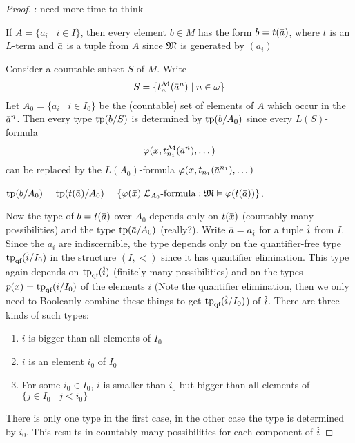\documentclass[11pt]{article}
\def \qf {\text{qf}}
\begin{document}
\begin{proof}
\label{BIG Problem}: need more time to think

If \(A=\{a_i\mid i\in I\}\), then every element \(b\in M\) has the form \(b=t(\bara)\), where \(t\) is
an \(L\)-term and \(\bara\) is a tuple from \(A\) since \(\mathfrak{M}\) is generated by \((a_i)\)

Consider a countable subset \(S\) of \(M\). Write
\begin{equation*}
S=\{t_n^{\calm}(\bara^n)\mid n\in\omega\}
\end{equation*}
Let \(A_0=\{a_i\mid i\in I_0\}\) be the (countable) set of elements of \(A\) which occur in
the \(\bara^n\). Then every type \(\operatorname{tp}(b/S)\) is determined by \(\operatorname{tp}(b/A_0)\) since
every \(L(S)\)-formula
\begin{equation*}
\varphi(x,t_{n_1}^{\calm}(\bara^{n}),\dots)
\end{equation*}
can be replaced by the \(L(A_0)\)-formula \(\varphi(x,t_{n_1}(\bara^{n_1}),\dots)\)

\(\tp(b/A_0)=\tp(t(\bara)/A_0)=\{\varphi(\barx)\; \call_{A_0}\text{-formula}: \fM\vDash\varphi(t(\bara))\}\).

Now the type of \(b=t(\bara)\) over \(A_0\) depends only on \(t(\barx)\) (countably many
possibilities) and the type \(\tp(\bara/A_0)\) (really?). Write \(\bara=a_{\bari}\) for a tuple \(\bari\)
from \(I\). \uline{Since the \(a_i\) are indiscernible, the type depends only on}
\uline{the quantifier-free type \(\tp_{\qf}(\bari/I_0)\) in the structure \((I,<)\)} since it has
quantifier elimination. This type again depends on \(\tp_{\qf}(\bari)\) (finitely many
possibilities) and on the types  \(p(x)=\tp_{\qf}(i/I_0)\) of the elements \(i\) (Note the
quantifier elimination, then we only need to Booleanly combine these things to get \(\tp_{\qf}(\bari/I_0)\))
of \(\bari\). There are three kinds of such types:
\begin{enumerate}
\item \(i\) is bigger than all elements of \(I_0\)
\item \(i\) is an element \(i_0\) of \(I_0\)
\item For some \(i_0\in I_0\), \(i\) is smaller than \(i_0\) but bigger than all elements
of \(\{j\in I_0\mid j<i_0\}\)
\end{enumerate}


There is only one type in the first case, in the other case the type is determined by \(i_0\).
This results in countably many possibilities for each component of \(\bari\)
\end{proof}
\end{document}
